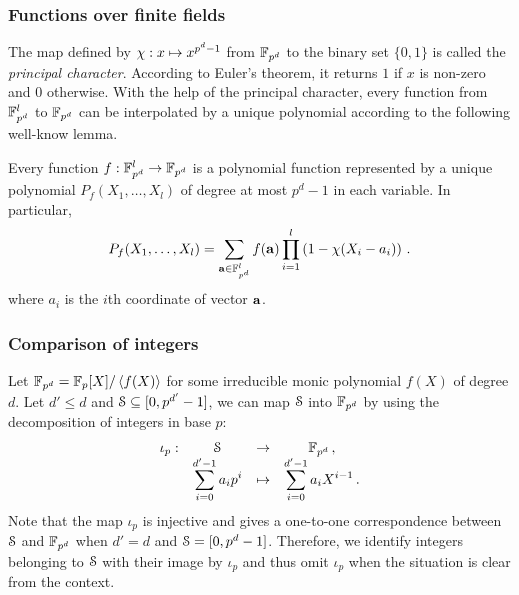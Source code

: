 \subsubsection{Functions over finite fields}\label{subsec:funcff}
The map defined by $\princhar: x \mapsto x^{p^d-1}$ from $\F_{p^d}$ to the binary set $\{0,1\}$ is called the \emph{principal character}. 
According to Euler's theorem, it returns $1$ if $x$ is non-zero and $0$ otherwise. 
With the help of the principal character, every function from $\F_{p^d}^l$ to $\F_{p^d}$ can be interpolated by a unique polynomial according to the following well-know lemma. 
\begin{lemma}\label{lem:interpolation}
  Every function $f: \F_{p^d}^l \rightarrow \F_{p^d}$ is a polynomial function represented by a unique polynomial $P_f(X_1,\dots,X_{l})$ of degree at most $p^d - 1$ in each variable.
  In particular,
  \begin{align*}
    P_f(X_1,\dots,X_{l}) = \sum_{\va \in \F^l_{p^d}} f(\va) \prod_{i=1}^{l} \left(1 - \princhar(X_i - a_i)\right)\,.
  \end{align*}
  where $a_i$ is the $i$th coordinate of vector $\va$. 
\end{lemma}

\subsubsection{Comparison of integers}
  Let $\F_{p^d} = \F_p[X]/\ideal{f(X)}$ for some irreducible monic polynomial $f(X)$ of degree $d$.
  Let $d'\leq d$ and $\S \subseteq [0,p^{d'}-1]$, we can map $\S$ into $\F_{p^d}$ by using the decomposition of integers in base $p$:
  $$\begin{array}{cccc}
      \iota_p : & \S & \rightarrow & \F_{p^d}\,, \\
              & \displaystyle\sum_{i=0}^{d'-1}a_ip^i & \mapsto & \displaystyle\sum_{i=0}^{d'-1}a_i X^{i-1}\,. 
    \end{array}$$
  Note that the map $\iota_p$ is injective and gives a one-to-one correspondence between $\S$ and $\F_{p^{d}}$ when $d'=d$ and $\S = [0,p^d-1]$. 
  Therefore, we identify integers belonging to $\S$ with their image by $\iota_p$ and thus omit $\iota_p$ when the situation is clear from the context.

